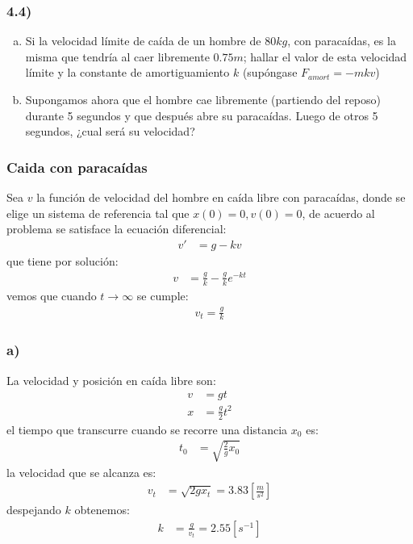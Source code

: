 \documentclass{article}
\begin{document}
\subsubsection*{4.4)}
\begin{enumerate}[a)]
    \item Si la velocidad límite de caída de un hombre de $80kg$, con paracaídas, es 
    la misma que tendría al caer libremente $0.75m$; hallar el valor de esta velocidad 
    límite y la constante de amortiguamiento $k$ (supóngase $F_{amort} = -mkv$)
    \item Supongamos ahora que el hombre cae libremente (partiendo del reposo) durante 
    5 segundos y que después abre su paracaídas. Luego de otros 5 segundos, ¿cual será su 
    velocidad? 
\end{enumerate}
\begin{tcolorbox}[breakable]
    \subsubsection*{Caida con paracaídas}
    Sea $v$ la función de velocidad del hombre en caída libre con paracaídas, donde se elige 
    un sistema de referencia tal que $x(0)=0, v(0) = 0$, de acuerdo al problema se 
    satisface la ecuación diferencial:
    \begin{align*}
        v' &= g - kv 
    \end{align*}
    que tiene por solución:
    \begin{align*}
        v &= \frac{g}{k} - \frac{g}{k}e^{-kt}
    \end{align*}
    vemos que cuando $t \to \infty$ se cumple:
    \begin{align*}
        v_t = \frac{g}{k}
    \end{align*}
    \subsubsection*{a)}
    La velocidad y posición en caída libre son:
    \begin{align*}
        v &= gt \\
        x &= \frac{g}{2}t^2 
    \end{align*}
    el tiempo que transcurre cuando se recorre una distancia $x_0$ es:
    \begin{align*}
        t_0 
        &= \sqrt{\frac{2}{g}x_0} 
    \end{align*}
    la velocidad que se alcanza es:
    \begin{align*}
        v_t 
        &= \sqrt{2gx_t} = 3.83 \left[ \frac{m}{s^2} \right]
    \end{align*}
    despejando $k$ obtenemos:
    \begin{align*}
        k 
        &= \frac{g}{v_t} = 2.55 [s^{-1}]
    \end{align*}

\end{tcolorbox}
\end{document}
